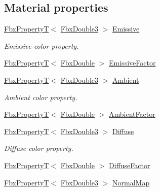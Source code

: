 \subsection*{Material properties}
\begin{DoxyCompactItemize}
\item 
\hyperlink{class_fbx_property_t}{Fbx\+PropertyT}$<$ \hyperlink{fbxtypes_8h_ae0a96f14cde566774c7553aa7523b7a7}{Fbx\+Double3} $>$ \hyperlink{class_fbx_surface_lambert_a8ca6383b7fe25ea69039b3340affb793}{Emissive}
\begin{DoxyCompactList}\small\item\em Emissive color property. \end{DoxyCompactList}\item 
\hyperlink{class_fbx_property_t}{Fbx\+PropertyT}$<$ \hyperlink{fbxtypes_8h_a171e72a1c46fc15c1a6c9c31948c1c5b}{Fbx\+Double} $>$ \hyperlink{class_fbx_surface_lambert_aad698a7a185c579fdf97131876c474ef}{Emissive\+Factor}
\item 
\hyperlink{class_fbx_property_t}{Fbx\+PropertyT}$<$ \hyperlink{fbxtypes_8h_ae0a96f14cde566774c7553aa7523b7a7}{Fbx\+Double3} $>$ \hyperlink{class_fbx_surface_lambert_af2b1a81d77c6cf53566cfae7f9873fd1}{Ambient}
\begin{DoxyCompactList}\small\item\em Ambient color property. \end{DoxyCompactList}\item 
\hyperlink{class_fbx_property_t}{Fbx\+PropertyT}$<$ \hyperlink{fbxtypes_8h_a171e72a1c46fc15c1a6c9c31948c1c5b}{Fbx\+Double} $>$ \hyperlink{class_fbx_surface_lambert_ad23d8852b1b3ef57e73b60d43728b67c}{Ambient\+Factor}
\item 
\hyperlink{class_fbx_property_t}{Fbx\+PropertyT}$<$ \hyperlink{fbxtypes_8h_ae0a96f14cde566774c7553aa7523b7a7}{Fbx\+Double3} $>$ \hyperlink{class_fbx_surface_lambert_a95f3a1ebeb92afb1e41a83088cc7e71f}{Diffuse}
\begin{DoxyCompactList}\small\item\em Diffuse color property. \end{DoxyCompactList}\item 
\hyperlink{class_fbx_property_t}{Fbx\+PropertyT}$<$ \hyperlink{fbxtypes_8h_a171e72a1c46fc15c1a6c9c31948c1c5b}{Fbx\+Double} $>$ \hyperlink{class_fbx_surface_lambert_a360be5445d5d6e4ab1fcba621853b32e}{Diffuse\+Factor}
\item 
\hyperlink{class_fbx_property_t}{Fbx\+PropertyT}$<$ \hyperlink{fbxtypes_8h_ae0a96f14cde566774c7553aa7523b7a7}{Fbx\+Double3} $>$ \hyperlink{class_fbx_surface_lambert_a2d543c9a3ee42c0443fa7b81ecb54754}{Normal\+Map}

\end{DoxyCompactItemize}
